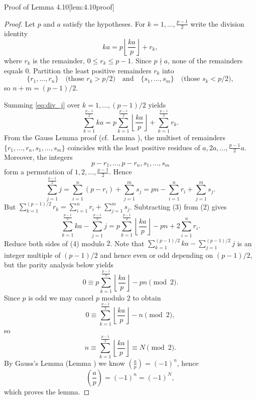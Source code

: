 \documentclass[10pt]{article}
\theoremstyle{definition}
\theoremstyle{plain}
\numberwithin{equation}{section}
\begin{document}
\bigskip

\begin{define}{Proof of Lemma 4.10}[lem:4.10proof]
\begin{proof}
Let $p$ and $a$ satisfy the hypotheses. For $k=1,\dots,\tfrac{p-1}{2}$ write the division identity
\begin{equation}\label{eq:div_j}
k a = p\left\lfloor\frac{k a}{p}\right\rfloor + r_k,
\end{equation}
where $r_k$ is the remainder, $0\le r_k\le p-1$. Since $p\nmid a$, none of the remainders equals $0$. Partition the least positive remainders $r_k$ into
\[
\{r_1,\dots,r_n\} \quad\text{(those }r_k>p/2\text{)}\quad\text{and}\quad
\{s_1,\dots,s_m\} \quad\text{(those }s_k<p/2\text{)},
\]
so $n+m=(p-1)/2$.

Summing \eqref{eq:div_j} over $k=1,\dots,(p-1)/2$ yields
\[
\sum_{k=1}^{\frac{p-1}{2}} k a
= p\sum_{k=1}^{\frac{p-1}{2}} \left\lfloor\frac{k a}{p}\right\rfloor + \sum_{k=1}^{\frac{p-1}{2}} r_k.
\tag{2}
\]
From the Gauss Lemma proof (cf.\ Lemma ), the multiset of remainders $\{r_1,\dots,r_n,s_1,\dots,s_m\}$ coincides with the least positive residues of $a,2a,\dots,\frac{p-1}{2}a$. Moreover, the integers
\[
p-r_1,\dots,p-r_n,s_1,\dots,s_m
\]
form a permutation of $1,2,\dots,\tfrac{p-1}{2}$. Hence
\[
\sum_{j=1}^{\frac{p-1}{2}} j = \sum_{i=1}^n (p-r_i) + \sum_{j=1}^m s_j
= pn - \sum_{i=1}^n r_i + \sum_{j=1}^m s_j .
\tag{3}
\]
But $\sum_{k=1}^{(p-1)/2} r_k=\sum_{i=1}^n r_i + \sum_{j=1}^m s_j$. Subtracting (3) from (2) gives
\[
\sum_{k=1}^{\frac{p-1}{2}} ka - \sum_{j=1}^{\frac{p-1}{2}} j
= p\sum_{k=1}^{\frac{p-1}{2}} \left\lfloor\frac{k a}{p}\right\rfloor - pn + 2\sum_{i=1}^n r_i.
\tag{4}
\]
Reduce both sides of (4) modulo $2$. Note that $\sum_{k=1}^{(p-1)/2} ka - \sum_{j=1}^{(p-1)/2} j$ is an integer multiple of $(p-1)/2$ and hence even or odd depending on $(p-1)/2$, but the parity analysis below yields
\[
0 \equiv p\sum_{k=1}^{\frac{p-1}{2}} \left\lfloor\frac{k a}{p}\right\rfloor - pn \pmod 2.
\]
Since $p$ is odd we may cancel $p$ modulo $2$ to obtain
\[
0 \equiv \sum_{k=1}^{\frac{p-1}{2}} \left\lfloor\frac{k a}{p}\right\rfloor - n \pmod 2,
\]
so
\[
n \equiv \sum_{k=1}^{\frac{p-1}{2}} \left\lfloor\frac{k a}{p}\right\rfloor \equiv N \pmod 2.
\]
By Gauss's Lemma (Lemma ) we know $(\tfrac{a}{p})=(-1)^n$, hence
\[
\left(\frac{a}{p}\right)=(-1)^n = (-1)^N,
\]
which proves the lemma.
\end{proof}
\end{define}
\end{document}
